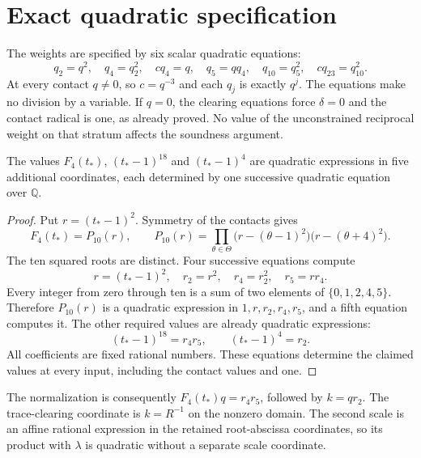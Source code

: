 \documentclass[11pt,a4paper]{article}
\newcommand{\Q}{\mathbb Q}\newcommand{\Z}{\mathbb Z}\newcommand{\HH}{\mathcal H}
\begin{document}
\section{Exact quadratic specification}
The weights are specified by six scalar quadratic equations:
\[
 q_2=q^2,\quad q_4=q_2^2,\quad c q_4=q,\quad
 q_5=qq_4,\quad q_{10}=q_5^2,\quad c q_{23}=q_{10}^2.
\]
At every contact $q\ne0$, so $c=q^{-3}$ and each $q_j$ is exactly
$q^j$. The equations make no division by a variable. If $q=0$, the
clearing equations force $\delta=0$ and the contact radical is one,
as already proved. No value of the unconstrained reciprocal weight
on that stratum affects the soundness argument.

\begin{lemma}\label{lem:contactcircuit}
The values $F_4(t_*)$, $(t_*-1)^{18}$ and $(t_*-1)^4$ are quadratic
expressions in five additional coordinates, each determined by one
successive quadratic equation over $\Q$.
\end{lemma}
\begin{proof}
Put $r=(t_*-1)^2$. Symmetry of the contacts gives
\[
 F_4(t_*)=P_{10}(r),\qquad
 P_{10}(r)=\prod_{\theta\in\Theta}
          \bigl(r-(\theta-1)^2\bigr)\bigl(r-(\theta+4)^2\bigr).
\]
The ten squared roots are distinct. Four successive equations compute
\[
                  r=(t_*-1)^2,\quad r_2=r^2,\quad
                  r_4=r_2^2,\quad r_5=rr_4.
\]
Every integer from zero through ten is a sum of two elements of
$\{0,1,2,4,5\}$. Therefore $P_{10}(r)$ is a quadratic expression
in $1,r,r_2,r_4,r_5$, and a fifth equation computes it.
The other required values are already quadratic expressions:
\[
                    (t_*-1)^{18}=r_4r_5,\qquad
                    (t_*-1)^4=r_2.
\]
All coefficients are fixed rational numbers. These equations determine
the claimed values at every input, including the contact values and one.
\end{proof}

The normalization is consequently $F_4(t_*)q=r_4r_5$, followed by
$k=qr_2$. The trace-clearing coordinate is $k=R^{-1}$ on the nonzero
domain. The second scale is an affine rational expression in the retained
root-abscissa coordinates, so its product with $\lambda$ is quadratic
without a separate scale coordinate.
\end{document}
